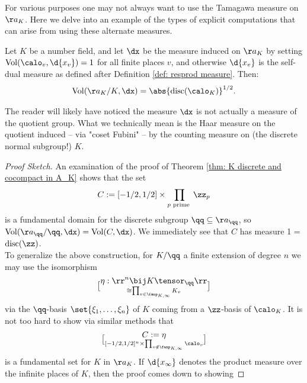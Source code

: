 \documentclass[11pt, x11names, openany]{book}
\begin{document}
\begin{example}
    \label{example: measure of A_K/K in number field case}
    For various purposes one may not always want to use the Tamagawa measure on $\aa_K$. Here we delve into an example of the types of explicit computations that can arise from using these alternate measures.

    Let $K$ be a number field, and let $\dx$ be the measure induced on $\aa_K$ by setting $\vol(\calo_v, \d{x_v}) = 1$ for all finite places $v$, and otherwise $\d{x_v}$ is the self-dual measure as defined after Definition \ref{def: resprod measure}. Then: 
    \begin{equation*}
        \vol(\aa_K/K, \dx) = \abs{\disc(\calo_K)}^{1/2}.
    \end{equation*}
    \begin{warning}
        The reader will likely have noticed the measure $\dx$ is not actually a measure of the quotient group. What we technically mean is the Haar measure on the quotient induced -- via "coset Fubini" -- by the counting measure on (the discrete normal subgroup!) $K$.
    \end{warning}
    \begin{proof}[Proof Sketch]
        An examination of the proof of Theorem \ref{thm: K discrete and cocompact in A_K} shows that the set 
        \begin{equation*}
            C := [-1/2, 1/2] \times \prod_{p \text{ prime }} \zz_p 
        \end{equation*}
        is a fundamental domain for the discrete subgroup $\qq \subseteq \aa_\qq$, so $\vol(\aa_\qq/\qq, \dx) = \vol(C, \dx)$. We immediately see that $C$ has measure 1 = $\disc(\zz)$.\\
        To generalize the above construction, for $K/\qq$ a finite extension of degree $n$ we may use the isomorphism 
        \begin{equation*}
            \eta: \rr^n \bij K \tensor_\qq \rr \brack{ \cong \prod_{v \in \fanp_{K, \infty}} K_v} 
        \end{equation*}
        via the  $\qq$-basis $\set{\xi_1, \ldots, \xi_n}$ of $K$ coming from a $\zz$-basis of $\calo_K$. It is not too hard to show via similar methods that
        \begin{equation*}
            C := \eta \brack{[-1/2, 1/2]^n} \times \prod_{v \notin \fanp_{K, \infty}} \calo_v
        \end{equation*}
        is a fundamental set for $K$ in $\aa_K$. If $\d{x_\infty}$ denotes the product measure over the infinite places of $K$, then the proof comes down to showing

\end{proof}
\end{example}
\end{document}
